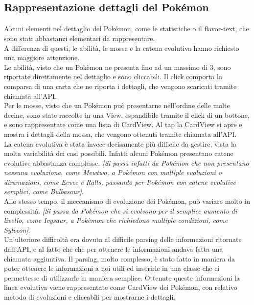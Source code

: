 \documentclass[a4paper,11pt]{article}
\begin{document}
  				\subsection{Rappresentazione dettagli del Pokémon}
  					\paragraph{}
  						Alcuni elementi nel dettaglio del Pokémon, come le statistiche o il flavor-text, che sono stati abbastanzi elementari da rappresentare.\\
  						A differenza di questi, le abilità, le mosse e la catena evolutiva hanno richiesto una maggiore attenzione.\\
  						Le abilità, visto che un Pokèmon ne presenta fino ad un massimo di 3, sono riportate direttamente nel dettaglio e sono cliccabili. Il click comporta la comparsa di una carta che ne riporta i dettagli, che vengono scaricati tramite chiamata all’API.\\
  						Per le mosse, visto che un Pokémon può presentarne nell’ordine delle molte decine, sono state raccolte in una View, espandibile tramite il click di un bottone, e sono rappresentate come una lista di CardView. Al tap la CardView si apre e mostra i dettagli della mossa, che vengono ottenuti tramite chiamata all’API.\\
  						La catena evolutiva è stata invece decisamente più difficile da gestire, vista la molta variabilità dei casi possibili. Infatti alcuni Pokémon presentano catene evolutive abbastanza complesse. \textit{[Si passa infatti da Pokémon che non presentano nessuna evoluzione, come Mewtwo, a Pokémon con multiple evoluzioni o diramazioni, come Eevee e Ralts, passando per Pokémon con catene evolutive semplici, come Bulbasaur]}.\\
  						 Allo stesso tempo, il meccanismo di evoluzione dei Pokémon, può variare molto in complessità. \textit{[Si passa da Pokémon che si evolvono per il semplice aumento di livello, come Ivysaur, a Pokèmon che richiedono multiple condizioni, come Sylveon]}.\\
  						 Un’ulteriore difficoltà era dovuta al difficile parsing delle informazioni ritornate dall’API, e al fatto che che per ottenere le informazioni andava fatta una chiamata aggiuntiva. Il parsing, molto complesso, è stato fatto in maniera da poter ottenere le informazioni a noi utili ed inserirle in una classe che ci permettesse di utilizzarle in maniera semplice. Ottenute queste informazioni la linea evolutiva viene rappresentate come CardView dei Pokémon, con relativo metodo di evoluzioni e cliccabili per mostrarne i dettagli.
\end{document}
